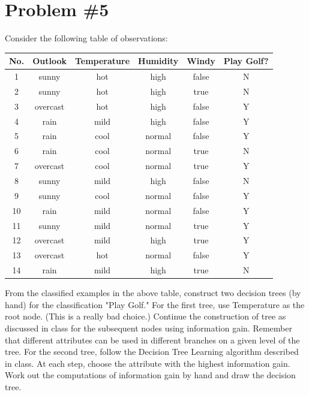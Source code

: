 \documentclass[12pt]{article}
\begin{document}
	\section*{Problem \#5}
	Consider the following table of observations:
	\begin{center}
		\begin{tabular*}{340pt}[t]{c | c c c c | c}
			No. & Outlook & Temperature & Humidity & Windy & Play Golf? \\
			\hline \hline
			1 & sunny & hot & high & false & N \\
			2 & sunny & hot & high & true & N \\
			3 & overcast & hot & high & false & Y \\
			4 & rain & mild & high & false & Y \\
			5 & rain & cool & normal & false & Y \\
			6 & rain & cool & normal & true & N \\
			7 & overcast & cool & normal & true & Y \\
			8 & sunny & mild & high & false & N \\
			9 & sunny & cool & normal & false & Y \\
			10 & rain & mild & normal & false & Y \\
			11 & sunny & mild & normal & true & Y \\
			12 & overcast & mild & high & true & Y \\
			13 & overcast & hot & normal & false & Y \\
			14 & rain & mild & high & true & N \\
		\end{tabular*}
	\end{center}
	From the classified examples in the above table, construct two decision trees (by hand) for the classification "Play Golf." For the  first tree, use Temperature as the root node. (This  is
	a really bad  choice.) Continue the construction  of  tree  as  discussed  in  class  for  the  subsequent  nodes using information  gain. Remember  that different attributes can be used in different branches on a given level of the tree. For the second tree, follow the  Decision Tree Learning  algorithm described  in class. At  each step,  choose  the  attribute  with  the  highest information gain. Work out the computations of information gain by hand and draw the decision tree.
\end{document}
